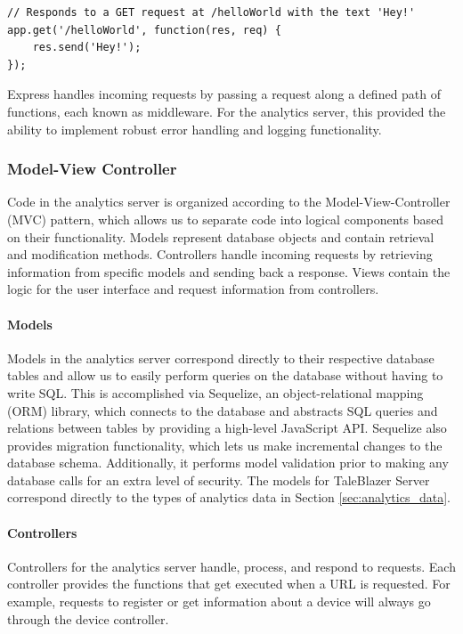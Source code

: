 \medskip
\begin{lstlisting}[caption={[Express URL Routing Example]Example of Express' URL routing}]
// Responds to a GET request at /helloWorld with the text 'Hey!'
app.get('/helloWorld', function(res, req) {
	res.send('Hey!');
});
\end{lstlisting}

Express handles incoming requests by passing a request along a defined path of functions, each known as middleware. For the analytics server, this provided the ability to implement robust error handling and logging functionality. 

\subsubsection{Model-View Controller}

Code in the analytics server is organized according to the Model-View-Controller (MVC) pattern, which allows us to separate code into logical components based on their functionality. Models represent database objects and contain retrieval and modification methods. Controllers handle incoming requests by retrieving information from specific models and sending back a response. Views contain the logic for the user interface and request information from controllers. 

\paragraph{Models} 
Models in the analytics server correspond directly to their respective database tables and allow us to easily perform queries on the database without having to write SQL. This is accomplished via Sequelize, an object-relational mapping (ORM) library, which connects to the database and abstracts SQL queries and relations between tables by providing a high-level JavaScript API. Sequelize also provides migration functionality, which lets us make incremental changes to the database schema. Additionally, it performs model validation prior to making any database calls for an extra level of security. The models for TaleBlazer Server correspond directly to the types of analytics data in Section \ref{sec:analytics_data}.


\paragraph{Controllers} 

Controllers for the analytics server handle, process, and respond to requests. Each controller provides the functions that get executed when a URL is requested. For example, requests to register or get information about a device will always go through the device controller.

